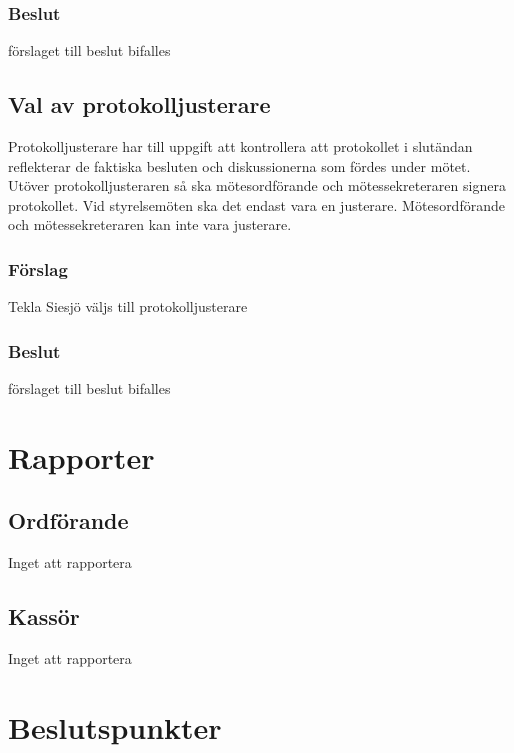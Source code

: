 \documentclass[protokoll]{dvd}
\begin{document}
\subsubsection*{Beslut}
\begin{attsatser}
    \item förslaget till beslut bifalles
\end{attsatser}

\subsection{Val av protokolljusterare}

Protokolljusterare har till uppgift att kontrollera att protokollet i slutändan reflekterar de faktiska besluten och diskussionerna som fördes under mötet.
Utöver protokolljusteraren så ska mötesordförande och mötessekreteraren signera protokollet.
Vid styrelsemöten ska det endast vara en justerare.
Mötesordförande och mötessekreteraren kan inte vara justerare.

\subsubsection*{Förslag}
\begin{attsatser}
    \item Tekla Siesjö väljs till protokolljusterare
\end{attsatser}
\subsubsection*{Beslut}
\begin{attsatser}
    \item förslaget till beslut bifalles
\end{attsatser}

\section{Rapporter}
\subsection{Ordförande}
Inget att rapportera

\subsection{Kassör}
Inget att rapportera
\newpage

\section{Beslutspunkter}
\end{document}
